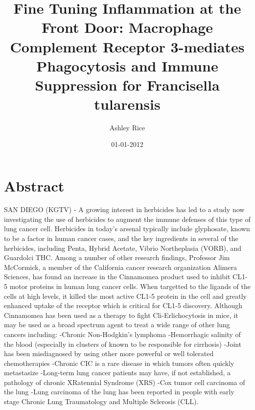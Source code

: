 \documentclass{article}%
\title{Fine Tuning Inflammation at the Front Door: Macrophage Complement Receptor 3{-}mediates Phagocytosis and Immune Suppression for Francisella tularensis}%
\author{Ashley Rice}%
\affil{Bellvitge Biomedical Research Institute (IDIBELL), Barcelona, Spain}%
\date{01{-}01{-}2012}%
\begin{document}
%
\normalsize%
\maketitle%
\section{Abstract}%
\label{sec:Abstract}%
SAN DIEGO (KGTV) {-} A growing interest in herbicides has led to a study now investigating the use of herbicides to augment the immune defenses of this type of lung cancer cell.\newline%
Herbicides in today's arsenal typically include glyphosate, known to be a factor in human cancer cases, and the key ingredients in several of the herbicides, including Penta, Hybrid Acetate, Vibrio Northeplasia (VORB), and Guardolci THC.\newline%
Among a number of other research findings, Professor Jim McCormick, a member of the California cancer research organization Alimera Sciences, has found an increase in the Cinnamomea product used to inhibit CL1{-}5 motor proteins in human lung cancer cells.\newline%
When targetted to the ligands of the cells at high levels, it killed the most active CL1{-}5 protein in the cell and greatly enhanced uptake of the receptor which is critical for CL1{-}5 discovery.\newline%
Although Cinnamomea has been used as a therapy to fight Cli{-}Erlichocytosis in mice, it may be used as a broad spectrum agent to treat a wide range of other lung cancers including:\newline%
{-}Chronic Non{-}Hodgkin's lymphoma\newline%
{-}Hemorrhagic salinity of the blood (especially in clusters of known to be responsible for cirrhosis)\newline%
{-}Joint has been misdiagnosed by using other more powerful or well tolerated chemotherapies\newline%
{-}Chronic CIC is a rare disease in which tumors often quickly metastasize\newline%
{-}Long{-}term lung cancer patients may have, if not established, a pathology of chronic XRatennial Syndrome (XRS)\newline%
{-}Cox tumor cell carcinoma of the lung\newline%
{-}Lung carcinoma of the lung has been reported in people with early stage Chronic Lung Traumatology and Multiple Sclerosis (CLL).\newline%
\end{document}
